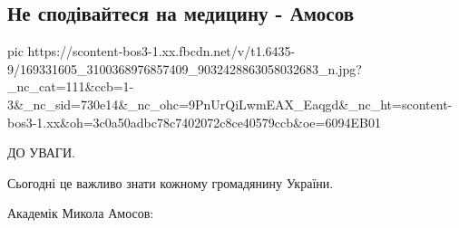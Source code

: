  
 
 
 
 

\subsection{Не сподівайтеся на медицину - Амосов}

\ifcmt
  pic https://scontent-bos3-1.xx.fbcdn.net/v/t1.6435-9/169331605_3100368976857409_9032428863058032683_n.jpg?_nc_cat=111&ccb=1-3&_nc_sid=730e14&_nc_ohc=9PnUrQiLwmEAX_Eaqgd&_nc_ht=scontent-bos3-1.xx&oh=3c0a50adbc78c7402072c8ce40579ccb&oe=6094EB01
\fi


ДО УВАГИ.

Сьогодні це важливо знати кожному громадянину України.

Академік Микола Амосов:

